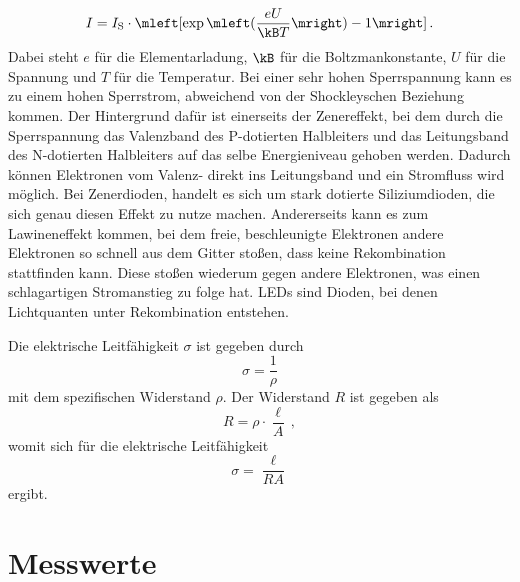 \documentclass[
12pt,
a4paper,
bibliography=totocnumbered, %
BCOR=1cm, %
oneside, %
]{scrartcl}
\newcommand{\lh}{\ell_{\mathrm{H}}}
\begin{document}
\begin{equation}
I=I_{\text{S}} \cdot \mleft[\exp\mleft( \frac{eU}{\kB T}\mright)-1 \mright]\,.
\end{equation}
Dabei steht \(e\) für die Elementarladung, \(\kB\) für die Boltzmankonstante, \(U\) für die Spannung und \(T\) für die Temperatur.
Bei einer sehr hohen Sperrspannung kann es zu einem hohen Sperrstrom, abweichend von der Shockleyschen Beziehung kommen. Der Hintergrund dafür ist einerseits der Zenereffekt, bei dem durch die Sperrspannung das Valenzband des P-dotierten Halbleiters und das Leitungsband des N-dotierten Halbleiters auf das selbe Energieniveau gehoben werden. Dadurch können Elektronen vom Valenz- direkt ins Leitungsband und ein Stromfluss wird möglich. Bei Zenerdioden, handelt es sich um stark dotierte Siliziumdioden, die sich genau diesen Effekt zu nutze machen.
Andererseits kann es zum Lawineneffekt kommen, bei dem freie, beschleunigte Elektronen andere Elektronen so schnell aus dem Gitter stoßen, dass keine Rekombination stattfinden kann. Diese stoßen wiederum gegen andere Elektronen, was einen schlagartigen Stromanstieg zu folge hat.
LEDs sind Dioden, bei denen Lichtquanten unter Rekombination entstehen.

Die elektrische Leitfähigkeit \(\sigma\) ist gegeben durch
\begin{equation}
	\sigma = \frac{1}{\rho}
\end{equation}
mit dem spezifischen Widerstand \(\rho\).
Der Widerstand \(R\) ist gegeben als
\begin{equation}
	R = \rho \cdot \frac{\ell}{A} \,,
\end{equation}
womit sich für die elektrische Leitfähigkeit
\begin{equation}\label{eq:Leitfähigkeit}
	\sigma = \frac{\ell}{RA}
\end{equation}
ergibt.

\section{Messwerte}
\end{document}
